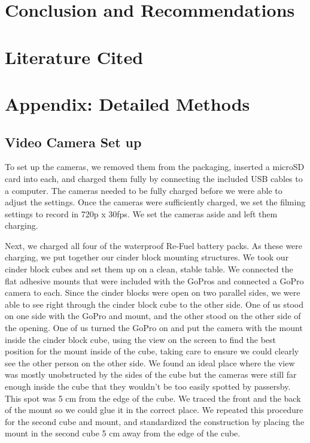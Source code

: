 \documentclass{article}\usepackage[]{graphicx}\usepackage[]{color}
\begin{document}
\section{Conclusion and Recommendations}


\section{Literature Cited}



\newpage
\section{Appendix: Detailed Methods}

\subsection{Video Camera Set up}

To set up the cameras, we removed them from the packaging, inserted a microSD card into each, and charged them fully by connecting the included USB cables to a computer. The cameras needed to be fully charged before we were able to adjust the settings. Once the cameras were sufficiently charged, we set the filming settings to record in 720p x 30fps. We set the cameras aside and left them charging. 

Next, we charged all four of the waterproof Re-Fuel battery packs. As these were charging, we put together our cinder block mounting structures. We took our cinder block cubes and set them up on a clean, stable table. We connected the flat adhesive mounts that were included with the GoPros and connected a GoPro camera to each. Since the cinder blocks were open on two parallel sides, we were able to see right through the cinder block cube to the other side. One of us stood on one side with the GoPro and mount, and the other stood on the other side of the opening. One of us turned the GoPro on and put the camera with the mount inside the cinder block cube, using the view on the screen to find the best position for the mount inside of the cube, taking care to ensure we could clearly see the other person on the other side. We found an ideal place where the view was mostly unobstructed by the sides of the cube but the cameras were still far enough inside the cube that they wouldn't be too easily spotted by passersby. This spot was 5 cm from the edge of the cube. We traced the front and the back of the mount so we could glue it in the correct place. We repeated this procedure for the second cube and mount, and standardized the construction by placing the mount in the second cube 5 cm away from the edge of the cube. 
\end{document}

